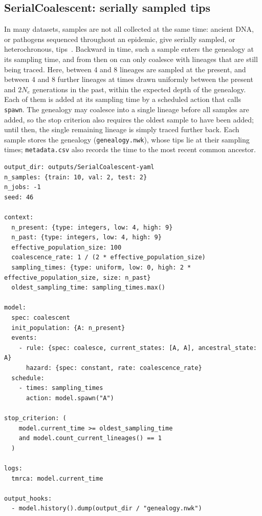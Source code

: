 \documentclass[11pt]{article}
\begin{document}
\subsection{SerialCoalescent: serially sampled tips}
\label{ex:serialcoal}

In many datasets, samples are not all collected at the same time: ancient DNA,
or pathogens sequenced throughout an epidemic, give serially sampled, or
heterochronous, tips~\citep{drummond2002serial}. Backward in time, such a sample
enters the genealogy at its sampling time, and from then on can only coalesce
with lineages that are still being traced. Here, between 4 and 8 lineages are
sampled at the present, and between 4 and 8 further lineages at times drawn
uniformly between the present and $2N_e$ generations in the past, within the
expected depth of the genealogy. Each of them is added at its sampling time by a
scheduled action that calls \texttt{spawn}. The genealogy may coalesce into a
single lineage before all samples are added, so the stop criterion also requires
the oldest sample to have been added; until then, the single remaining lineage
is simply traced further back. Each sample stores the genealogy
(\texttt{genealogy.nwk}), whose tips lie at their sampling times;
\texttt{metadata.csv} also records the time to the most recent common ancestor.

\begin{lstlisting}[style=cfg]
output_dir: outputs/SerialCoalescent-yaml
n_samples: {train: 10, val: 2, test: 2}
n_jobs: -1
seed: 46

context:
  n_present: {type: integers, low: 4, high: 9}
  n_past: {type: integers, low: 4, high: 9}
  effective_population_size: 100
  coalescence_rate: 1 / (2 * effective_population_size)
  sampling_times: {type: uniform, low: 0, high: 2 * effective_population_size, size: n_past}
  oldest_sampling_time: sampling_times.max()

model:
  spec: coalescent
  init_population: {A: n_present}
  events:
    - rule: {spec: coalesce, current_states: [A, A], ancestral_state: A}
      hazard: {spec: constant, rate: coalescence_rate}
  schedule:
    - times: sampling_times
      action: model.spawn("A")

stop_criterion: (
    model.current_time >= oldest_sampling_time
    and model.count_current_lineages() == 1
  )

logs:
  tmrca: model.current_time

output_hooks:
  - model.history().dump(output_dir / "genealogy.nwk")
\end{lstlisting}
\end{document}
